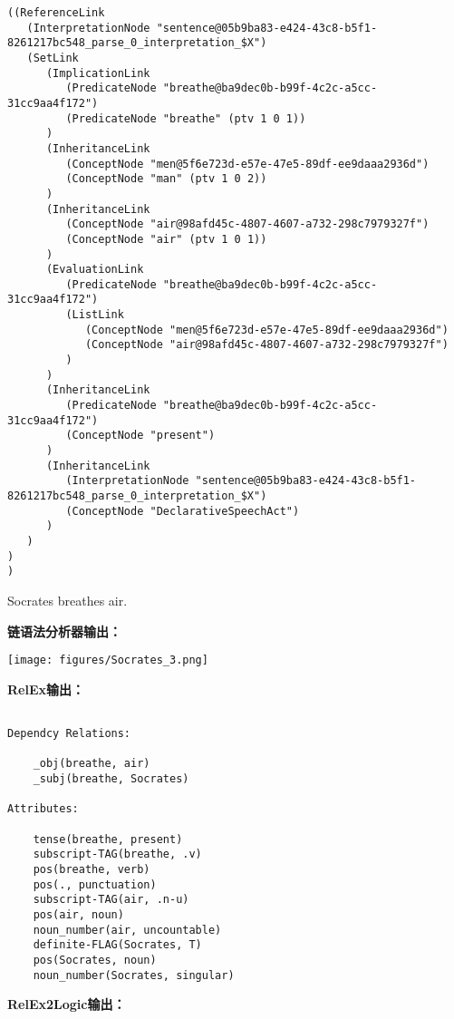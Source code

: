 {\tt\begin{small}\begin{lstlisting}
((ReferenceLink
   (InterpretationNode "sentence@05b9ba83-e424-43c8-b5f1-8261217bc548_parse_0_interpretation_$X")
   (SetLink
      (ImplicationLink
         (PredicateNode "breathe@ba9dec0b-b99f-4c2c-a5cc-31cc9aa4f172")
         (PredicateNode "breathe" (ptv 1 0 1))
      )
      (InheritanceLink
         (ConceptNode "men@5f6e723d-e57e-47e5-89df-ee9daaa2936d")
         (ConceptNode "man" (ptv 1 0 2))
      )
      (InheritanceLink
         (ConceptNode "air@98afd45c-4807-4607-a732-298c7979327f")
         (ConceptNode "air" (ptv 1 0 1))
      )
      (EvaluationLink
         (PredicateNode "breathe@ba9dec0b-b99f-4c2c-a5cc-31cc9aa4f172")
         (ListLink
            (ConceptNode "men@5f6e723d-e57e-47e5-89df-ee9daaa2936d")
            (ConceptNode "air@98afd45c-4807-4607-a732-298c7979327f")
         )
      )
      (InheritanceLink
         (PredicateNode "breathe@ba9dec0b-b99f-4c2c-a5cc-31cc9aa4f172")
         (ConceptNode "present")
      )
      (InheritanceLink
         (InterpretationNode "sentence@05b9ba83-e424-43c8-b5f1-8261217bc548_parse_0_interpretation_$X")
         (ConceptNode "DeclarativeSpeechAct")
      )
   )
)
)
\end{lstlisting}\end{small}}

  Socrates breathes air.

{\bf 链语法分析器输出：}

\texttt{[image: figures/Socrates\_3.png]}

{\bf RelEx输出：}

\begin{verbatim}

Dependcy Relations:

    _obj(breathe, air)
    _subj(breathe, Socrates)

Attributes:

    tense(breathe, present)
    subscript-TAG(breathe, .v)
    pos(breathe, verb)
    pos(., punctuation)
    subscript-TAG(air, .n-u)
    pos(air, noun)
    noun_number(air, uncountable)
    definite-FLAG(Socrates, T)
    pos(Socrates, noun)
    noun_number(Socrates, singular)

\end{verbatim}

{\bf RelEx2Logic输出：}

